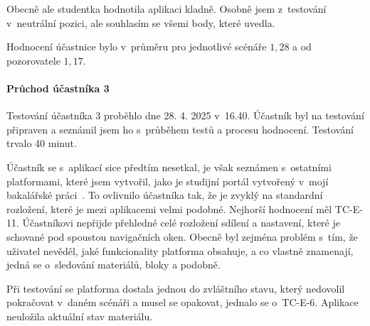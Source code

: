 Obecně ale studentka hodnotila aplikaci kladně.
Osobně jsem z~testování v~neutrální pozici, ale souhlasím se všemi body, které uvedla.

Hodnocení účastnice bylo v~průměru pro jednotlivé scénáře $1,28$ a od pozorovatele $1,17$.


\paragraph{Průchod účastníka 3}

Testování účastníka 3 proběhlo dne 28. 4. 2025 v~16.40. 
Účastník byl na testování připraven a seznámil jsem ho s~průběhem testů a procesu hodnocení. 
Testování trvalo 40 minut.

Účastník se s~aplikací sice předtím nesetkal, je však seznámen s~ostatními platformami, které jsem vytvořil, jako je studijní portál vytvořený v~mojí bakalářské práci~\cite{cajthaml_bp}.
To ovlivnilo účastníka tak, že je zvyklý na standardní rozložení, které je mezi aplikacemi velmi podobné.
Nejhorší hodnocení měl TC-E-11. 
Účastníkovi nepřijde přehledné celé rozložení sdílení a nastavení, které je schované pod spoustou navigačních oken.
Obecně byl zejména problém s~tím, že uživatel nevěděl, jaké funkcionality platforma obsahuje, a co vlastně znamenají, jedná se o~sledování materiálů, bloky a podobně.

Při testování se platforma dostala jednou do zvláštního stavu, který nedovolil pokračovat v~daném scénáři a musel se opakovat, jednalo se o~TC-E-6.
Aplikace neuložila aktuální stav materiálu.

